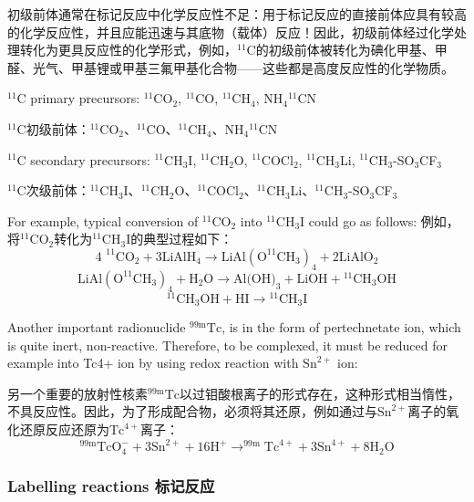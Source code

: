 \documentclass[dvipsnames, svgnames,a4paper,11pt]{article}
\begin{document}
初级前体通常在标记反应中化学反应性不足：用于标记反应的直接前体应具有较高的化学反应性，并且应能迅速与其底物（载体）反应！因此，初级前体经过化学处理转化为更具反应性的化学形式，例如，${}^{11}\mathrm{C}$的初级前体被转化为碘化甲基、甲醛、光气、甲基锂或甲基三氟甲基化合物——这些都是高度反应性的化学物质。

${}^{11}\mathrm{C}$ primary precursors: ${}^{11}\mathrm{CO}_2$, ${}^{11}\mathrm{C}$O, ${}^{11}\mathrm{CH}_4$, NH$_4{}^{11}\mathrm{C}$N

${}^{11}\mathrm{C}$初级前体：${}^{11}\mathrm{CO}_2$、${}^{11}\mathrm{C}$O、${}^{11}\mathrm{CH}_4$、NH$_4{}^{11}\mathrm{C}$N

${}^{11}\mathrm{C}$ secondary precursors: ${}^{11}\mathrm{C}$H$_3$I, ${}^{11}\mathrm{C}$H$_2$O, ${}^{11}\mathrm{C}$OCl$_2$, ${}^{11}\mathrm{C}$H$_3$Li, ${}^{11}\mathrm{C}$H$_3$-SO$_3$CF$_3$

${}^{11}\mathrm{C}$次级前体：${}^{11}\mathrm{C}$H$_3$I、${}^{11}\mathrm{C}$H$_2$O、${}^{11}\mathrm{C}$OCl$_2$、${}^{11}\mathrm{C}$H$_3$Li、${}^{11}\mathrm{C}$H$_3$-SO$_3$CF$_3$

For example, typical conversion of ${}^{11}\mathrm{CO_2}$ into ${}^{11}\mathrm{CH_3I}$ could go as follows:
例如，将${}^{11}\mathrm{CO_2}$转化为${}^{11}\mathrm{CH_3I}$的典型过程如下：
\[
      \text{4 }^{11}\text{CO}_2 + 3\text{LiAlH}_4 \rightarrow \text{LiAl}(\text{O}^{11}\text{CH}_3)_4 + 2\text{LiAlO}_2
\]
\[
      \text{LiAl}(\text{O}^{11}\text{CH}_3)_4 + \text{H}_2\text{O} \rightarrow \text{Al(OH)}_3 + \text{LiOH} + {}^{11}\text{CH}_3\text{OH}
\]
\[
      {}^{11}\text{CH}_3\text{OH} + \text{HI} \rightarrow {}^{11}\text{CH}_3\text{I}
\]

Another important radionuclide ${}^\mathrm{99m}\mathrm{Tc}$, is in the form of pertechnetate ion, which is
quite inert, non-reactive. Therefore, to be complexed, it must be reduced for example
into Tc4+ ion by using redox reaction with $\text{Sn}^{2+}$ ion:

另一个重要的放射性核素${}^\mathrm{99m}\mathrm{Tc}$以过钼酸根离子的形式存在，这种形式相当惰性，不具反应性。因此，为了形成配合物，必须将其还原，例如通过与$\text{Sn}^{2+}$离子的氧化还原反应还原为$\text{Tc}^{4+}$离子：
\[
      ^{99\text{m}}\text{TcO}_4^- + 3\text{Sn}^{2+} + 16\text{H}^+ \rightarrow ^{99\text{m}}\text{Tc}^{4+} + 3\text{Sn}^{4+} + 8\text{H}_2\text{O}
\]

\subsubsection{Labelling reactions 标记反应}
\end{document}
